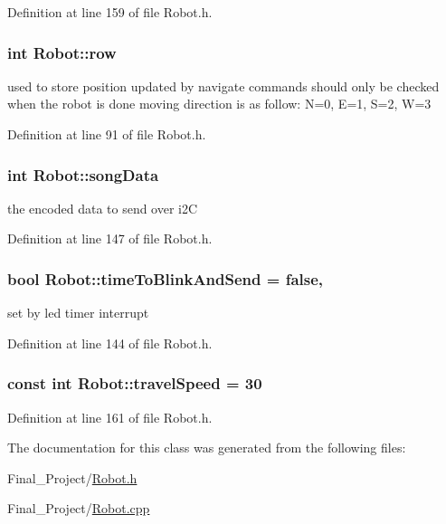 Definition at line 159 of file Robot.\-h.

\hypertarget{classRobot_a35ce5c416a079fcf6b943843ec151d63}{
\subsubsection[{row}]{\setlength{\rightskip}{0pt plus 5cm}int Robot\-::row}}\label{classRobot_a35ce5c416a079fcf6b943843ec151d63}


used to store position updated by navigate commands should only be checked when the robot is done moving direction is as follow\-: N=0, E=1, S=2, W=3 



Definition at line 91 of file Robot.\-h.

\hypertarget{classRobot_a7818916adfa736ab4cb21011fe302cdb}{
\subsubsection[{song\-Data}]{\setlength{\rightskip}{0pt plus 5cm}int Robot\-::song\-Data\hspace{0.3cm}{\ttfamily [private]}}}\label{classRobot_a7818916adfa736ab4cb21011fe302cdb}


the encoded data to send over i2\-C 



Definition at line 147 of file Robot.\-h.

\hypertarget{classRobot_aa074884ad594acf20282805c811adaff}{
\subsubsection[{time\-To\-Blink\-And\-Send}]{\setlength{\rightskip}{0pt plus 5cm}bool Robot\-::time\-To\-Blink\-And\-Send = false\hspace{0.3cm}{\ttfamily [static]}, {\ttfamily [private]}}}\label{classRobot_aa074884ad594acf20282805c811adaff}


set by led timer interrupt 



Definition at line 144 of file Robot.\-h.

\hypertarget{classRobot_a87ec942d7d53b1a4b1c46422f6a134eb}{
\subsubsection[{travel\-Speed}]{\setlength{\rightskip}{0pt plus 5cm}const int Robot\-::travel\-Speed = 30\hspace{0.3cm}{\ttfamily [private]}}}\label{classRobot_a87ec942d7d53b1a4b1c46422f6a134eb}


Definition at line 161 of file Robot.\-h.



The documentation for this class was generated from the following files\-:\begin{DoxyCompactItemize}
\item 
Final\-\_\-\-Project/\hyperlink{Robot_8h}{Robot.\-h}\item 
Final\-\_\-\-Project/\hyperlink{Robot_8cpp}{Robot.\-cpp}\end{DoxyCompactItemize}
